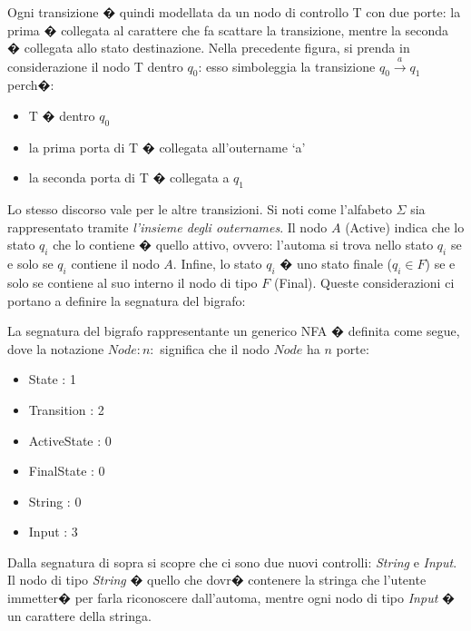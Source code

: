 Ogni transizione � quindi modellata da un nodo di controllo T con due porte: la prima � collegata al carattere che fa scattare la transizione, mentre la seconda � collegata allo stato destinazione. Nella precedente figura, si prenda in considerazione il nodo T dentro $q_0$: esso simboleggia la transizione $q_0\stackrel{a}{\longrightarrow} q_1$ perch�:
\begin{itemize}
	\item
	T � dentro $q_0$
	\item
	la prima porta di T � collegata all'outername `a'
	\item
	la seconda porta di T � collegata a $q_1$
\end{itemize}

Lo stesso discorso vale per le altre transizioni. Si noti come l'alfabeto $\Sigma$ sia rappresentato tramite \emph{l'insieme degli outernames}.
Il nodo $A$ (Active) indica che lo stato $q_i$ che lo contiene � quello attivo, ovvero: l'automa si trova nello stato $q_i$ se e solo se $q_i$ contiene il nodo $A$.
Infine, lo stato $q_i$ � uno stato finale ($q_i \in F$) se e solo se contiene al suo interno il nodo di tipo $F$ (Final). Queste considerazioni ci portano a definire la segnatura del bigrafo:

\begin{prop}
La segnatura del bigrafo rappresentante un generico NFA � definita come segue, dove la notazione $Node:n:$ significa che il nodo $Node$ ha $n$ porte:
\begin{itemize}
	\item
	State : 1 
	\item
	Transition : 2
	\item
	ActiveState : 0 
	\item
	FinalState : 0 
	\item
	String : 0 
	\item
	Input : 3 
\end{itemize}
\end{prop}


Dalla segnatura di sopra si scopre che ci sono due nuovi controlli: \emph{String} e \emph{Input}. Il nodo di tipo \emph{String} � quello che dovr� contenere la stringa che l'utente immetter� per farla riconoscere dall'automa, mentre ogni nodo di tipo \emph{Input} � un carattere della stringa. 


